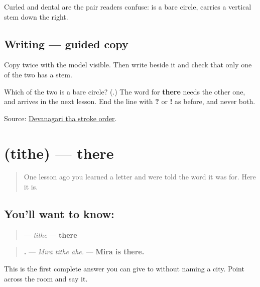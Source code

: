 Curled \textbf{} and dental \textbf{} are the pair readers confuse: \textbf{} is a bare circle, \textbf{} carries a vertical stem down the right.

\subsection*{Writing — guided copy}

Copy \textbf{} twice with the model visible. Then write \textbf{} beside it and check that only one of the two has a stem.

\begin{tcolorbox}[breakable,colback=teal!4,colframe=teal!35!black,title={Before you move on}]
Which of the two is a bare circle? (\textbf{}.) The word for \textbf{there} needs the other one, and arrives in the next lesson. End the line with \textbf{?} or \textbf{!} as before, and never both.

Source: \href{https://commons.wikimedia.org/wiki/File:Deva-\%E0\%A4\%A5-order.gif}{Devanagari tha stroke order}.
\end{tcolorbox}
\section[\texorpdfstring{\mr{तिथे} (tithe)}{तिथे (tithe)}]{ (tithe) — there}

\label{lesson:MR-C39-tithe}



\begin{quote}
One lesson ago you learned a letter and were told the word it was for. Here it is.
\end{quote}

\subsection*{You'll want to know: }
\begin{quote}
\textbf{} — \emph{tithe} — \textbf{there}
\end{quote}

\begin{quote}
\textbf{  .} — \emph{Mīrā tithe āhe.} — \textbf{Mira is there.}
\end{quote}

This is the first complete answer you can give to \textbf{} without naming a city. Point across the room and say it.

